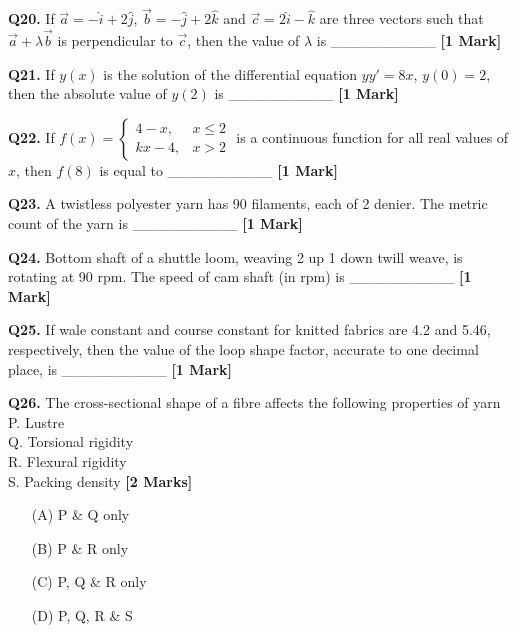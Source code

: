 \documentclass[11pt]{article}
\newcommand{\questiona}[2]{
    \noindent\textbf{Q#2.} #1 \hfill \textbf{[1 Mark]}
}
\newcommand{\questionb}[2]{
    \noindent\textbf{Q#2.} #1 \hfill \textbf{[2 Marks]}
}
\begin{document}
\questiona{If \( \vec{a} = -\hat{i} + 2\hat{j} \), \( \vec{b} = -\hat{j} + 2\hat{k} \) and \( \vec{c} = 2\hat{i} - \hat{k} \) are three vectors such that \( \vec{a} + \lambda \vec{b} \) is perpendicular to \( \vec{c} \), then the value of \( \lambda \) is \_\_\_\_\_\_\_\_\_\_}{20}
\vspace{0.5cm}

\questiona{If \( y(x) \) is the solution of the differential equation \( y y' = 8x \), \( y(0) = 2 \), then the absolute value of \( y(2) \) is \_\_\_\_\_\_\_\_\_\_}{21}
\vspace{0.5cm}

\questiona{If \( f(x) = \begin{cases} 4 - x, & x \leq 2 \\ kx - 4, & x > 2 \end{cases} \) is a continuous function for all real values of \( x \), then \( f(8) \) is equal to \_\_\_\_\_\_\_\_\_\_}{22}
\vspace{0.5cm}

\questiona{A twistless polyester yarn has 90 filaments, each of 2 denier. The metric count of the yarn is \_\_\_\_\_\_\_\_\_\_}{23}
\vspace{0.5cm}

\questiona{Bottom shaft of a shuttle loom, weaving 2 up 1 down twill weave, is rotating at 90 rpm. The speed of cam shaft (in rpm) is \_\_\_\_\_\_\_\_\_\_}{24}
\vspace{0.5cm}

\questiona{If wale constant and course constant for knitted fabrics are 4.2 and 5.46, respectively, then the value of the loop shape factor, accurate to one decimal place, is \_\_\_\_\_\_\_\_\_\_}{25}
\vspace{0.5cm}

\questionb{The cross-sectional shape of a fibre affects the following properties of yarn \\
P. Lustre \\
Q. Torsional rigidity \\
R. Flexural rigidity \\
S. Packing density}{26}
\begin{enumerate}
    \item[(A)] P \& Q only
    \item[(B)] P \& R only
    \item[(C)] P, Q \& R only
    \item[(D)] P, Q, R \& S
\end{enumerate}
\vspace{0.5cm}
\end{document}
